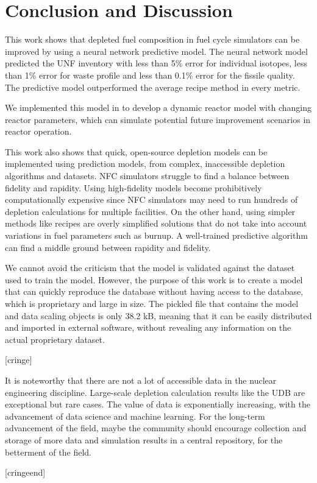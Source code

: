 \section{Conclusion and Discussion}

This work shows that depleted fuel composition
in fuel cycle simulators can be improved
by using a neural network predictive model.
The neural network model predicted the \gls{UNF} inventory
with less than 5\% error for individual isotopes,
less than 1\% error for waste profile 
and less than 0.1\% error for the fissile quality.
The predictive model outperformed the average recipe
method in every metric.

We implemented this model in \Cyclus to develop a
dynamic reactor model with changing reactor parameters,
which can simulate potential future improvement scenarios
in reactor operation.

This work also shows that quick, open-source depletion models
can be implemented using prediction models, from
complex, inaccessible depletion algorithms and
datasets. \gls{NFC} simulators struggle to find a balance
between fidelity and rapidity. Using high-fidelity
models become prohibitively computationally expensive
since \gls{NFC} simulators may need to run
hundreds of depletion calculations for multiple
facilities. On the other hand, using simpler methods
like recipes are overly simplified solutions
that do not take into account variations in fuel
parameters such as burnup.
A well-trained predictive algorithm can find a middle
ground between rapidity and fidelity.

We cannot avoid the criticism that the model is validated
against the dataset used to train the model. However, the purpose
of this work is to create a model that can quickly reproduce the
database without having access to the database, which is proprietary
and large in size. The pickled file that contains
the model and data scaling objects is only 38.2 kB, meaning that it
can be easily distributed and imported in external software, without
revealing any information on the actual proprietary dataset.

[cringe]

It is noteworthy that there are not a lot of accessible data in the
nuclear engineering discipline. Large-scale depletion
calculation results like the \gls{UDB} are exceptional
but rare cases. The value of data is exponentially increasing,
with the advancement of data science and machine learning.
For the long-term advancement of the field, maybe the
community should encourage collection and storage of more
data and simulation results in
a central repository, for the betterment of the field.

[cringeend]

